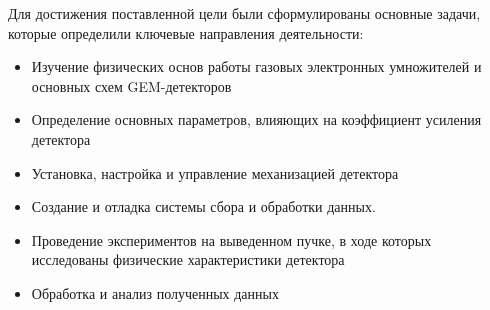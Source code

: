 Для достижения поставленной цели были сформулированы основные задачи, которые определили ключевые направления деятельности:
\begin{itemize}
    
    \item Изучение физических основ работы газовых электронных умножителей и основных схем GEM-детекторов
    \item Определение основных параметров, влияющих на коэффициент усиления детектора 
    \item  Установка, настройка и управление механизацией детектора
    \item Создание и отладка системы сбора и обработки данных.
    \item Проведение экспериментов на выведенном пучке, в ходе которых исследованы физические характеристики детектора
    \item Обработка и анализ полученных данных 
	
\end{itemize}